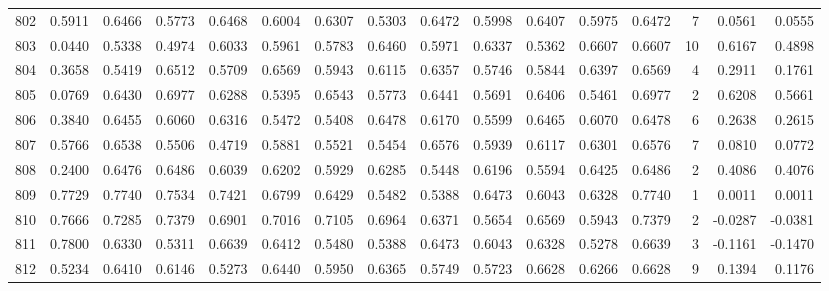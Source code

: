 \begin{tabular}{lrrrrrrrrrrrrrrr}
802 &      0.5911 &  0.6466 &  0.5773 &  0.6468 &  0.6004 &  0.6307 &  0.5303 &  0.6472 &  0.5998 &  0.6407 &   0.5975 &     0.6472 &      7 &                    0.0561 &                     0.0555 \\
803 &      0.0440 &  0.5338 &  0.4974 &  0.6033 &  0.5961 &  0.5783 &  0.6460 &  0.5971 &  0.6337 &  0.5362 &   0.6607 &     0.6607 &     10 &                    0.6167 &                     0.4898 \\
804 &      0.3658 &  0.5419 &  0.6512 &  0.5709 &  0.6569 &  0.5943 &  0.6115 &  0.6357 &  0.5746 &  0.5844 &   0.6397 &     0.6569 &      4 &                    0.2911 &                     0.1761 \\
805 &      0.0769 &  0.6430 &  0.6977 &  0.6288 &  0.5395 &  0.6543 &  0.5773 &  0.6441 &  0.5691 &  0.6406 &   0.5461 &     0.6977 &      2 &                    0.6208 &                     0.5661 \\
806 &      0.3840 &  0.6455 &  0.6060 &  0.6316 &  0.5472 &  0.5408 &  0.6478 &  0.6170 &  0.5599 &  0.6465 &   0.6070 &     0.6478 &      6 &                    0.2638 &                     0.2615 \\
807 &      0.5766 &  0.6538 &  0.5506 &  0.4719 &  0.5881 &  0.5521 &  0.5454 &  0.6576 &  0.5939 &  0.6117 &   0.6301 &     0.6576 &      7 &                    0.0810 &                     0.0772 \\
808 &      0.2400 &  0.6476 &  0.6486 &  0.6039 &  0.6202 &  0.5929 &  0.6285 &  0.5448 &  0.6196 &  0.5594 &   0.6425 &     0.6486 &      2 &                    0.4086 &                     0.4076 \\
809 &      0.7729 &  0.7740 &  0.7534 &  0.7421 &  0.6799 &  0.6429 &  0.5482 &  0.5388 &  0.6473 &  0.6043 &   0.6328 &     0.7740 &      1 &                    0.0011 &                     0.0011 \\
810 &      0.7666 &  0.7285 &  0.7379 &  0.6901 &  0.7016 &  0.7105 &  0.6964 &  0.6371 &  0.5654 &  0.6569 &   0.5943 &     0.7379 &      2 &                   -0.0287 &                    -0.0381 \\
811 &      0.7800 &  0.6330 &  0.5311 &  0.6639 &  0.6412 &  0.5480 &  0.5388 &  0.6473 &  0.6043 &  0.6328 &   0.5278 &     0.6639 &      3 &                   -0.1161 &                    -0.1470 \\
812 &      0.5234 &  0.6410 &  0.6146 &  0.5273 &  0.6440 &  0.5950 &  0.6365 &  0.5749 &  0.5723 &  0.6628 &   0.6266 &     0.6628 &      9 &                    0.1394 &                     0.1176 \\

\end{tabular}

